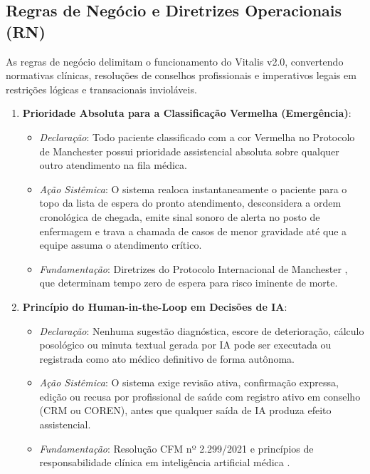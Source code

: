 \endgroup

\subsection{Regras de Negócio e Diretrizes Operacionais (RN)}

As regras de negócio delimitam o funcionamento do Vitalis v2.0, convertendo normativas clínicas, resoluções de conselhos profissionais e imperativos legais em restrições lógicas e transacionais invioláveis.

\begin{enumerate}[label=\textbf{RN-\arabic*:}, leftmargin=*]
    \item \textbf{Prioridade Absoluta para a Classificação Vermelha (Emergência)}:
    \begin{itemize}[noitemsep]
        \item \textit{Declaração}: Todo paciente classificado com a cor Vermelha no Protocolo de Manchester possui prioridade assistencial absoluta sobre qualquer outro atendimento na fila médica.
        \item \textit{Ação Sistêmica}: O sistema realoca instantaneamente o paciente para o topo da lista de espera do pronto atendimento, desconsidera a ordem cronológica de chegada, emite sinal sonoro de alerta no posto de enfermagem e trava a chamada de casos de menor gravidade até que a equipe assuma o atendimento crítico.
        \item \textit{Fundamentação}: Diretrizes do Protocolo Internacional de Manchester \cite{manchester:2014}, que determinam tempo zero de espera para risco iminente de morte.
    \end{itemize}

    \item \textbf{Princípio do Human-in-the-Loop em Decisões de IA}:
    \begin{itemize}[noitemsep]
        \item \textit{Declaração}: Nenhuma sugestão diagnóstica, escore de deterioração, cálculo posológico ou minuta textual gerada por IA pode ser executada ou registrada como ato médico definitivo de forma autônoma.
        \item \textit{Ação Sistêmica}: O sistema exige revisão ativa, confirmação expressa, edição ou recusa por profissional de saúde com registro ativo em conselho (CRM ou COREN), antes que qualquer saída de IA produza efeito assistencial.
        \item \textit{Fundamentação}: Resolução CFM nº 2.299/2021 \cite{cfm_digital:2021} e princípios de responsabilidade clínica em inteligência artificial médica \cite{topol:2019}.
    \end{itemize}


\end{enumerate}
